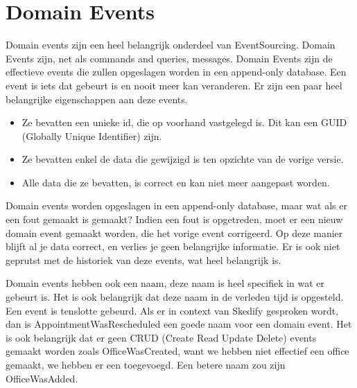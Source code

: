 
\section{Domain Events}
\label{sec:domain-events}

Domain events zijn een heel belangrijk onderdeel van EventSourcing. Domain Events zijn, net als commands and queries, messages. Domain Events zijn de effectieve events die zullen opgeslagen worden in een append-only database. Een event is iets dat gebeurt is en nooit meer kan veranderen. Er zijn een paar heel belangrijke eigenschappen aan deze events.

\begin{itemize}
  \item{Ze bevatten een unieke id, die op voorhand vastgelegd is. Dit kan een GUID (Globally Unique Identifier) zijn.}
  \item{Ze bevatten enkel de data die gewijzigd is ten opzichte van de vorige versie.}
  \item{Alle data die ze bevatten, is correct en kan niet meer aangepast worden.}
\end{itemize}

Domain events worden opgeslagen in een append-only database, maar wat als er een fout gemaakt is gemaakt?
Indien een fout is opgetreden, moet er een nieuw domain event gemaakt worden, die het vorige event corrigeerd. Op deze manier blijft al je data correct, en verlies je geen belangrijke informatie. Er is ook niet geprutst met de historiek van deze events, wat heel belangrijk is.

Domain events hebben ook een naam, deze naam is heel specifiek in wat er gebeurt is. Het is ook belangrijk dat deze naam in de verleden tijd is opgesteld. Een event is tenslotte gebeurd. Als er in context van Skedify gesproken wordt, dan is AppointmentWasRescheduled een goede naam voor een domain event. Het is ook belangrijk dat er geen CRUD (Create Read Update Delete) events gemaakt worden zoals OfficeWasCreated, want we hebben niet effectief een office gemaakt, we hebben er een toegevoegd. Een betere naam zou zijn OfficeWasAdded.